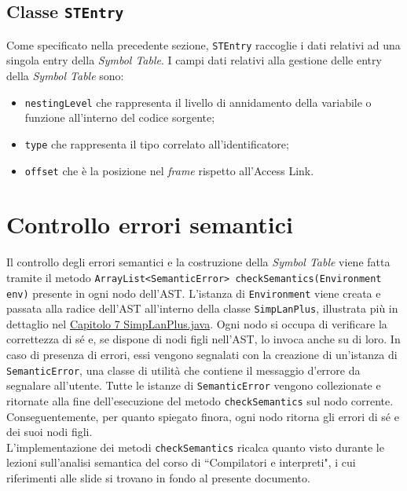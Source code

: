 \documentclass[../report.tex]{subfiles}
\begin{document}
\subsection[Classe STEntry]{Classe \texttt{STEntry}}
Come specificato nella precedente sezione, \verb|STEntry| raccoglie i dati relativi ad una singola entry della \textit{Symbol Table}.
I campi dati relativi alla gestione delle entry della \textit{Symbol Table} sono:
\begin{itemize}
    \item \verb|nestingLevel| che rappresenta il livello di annidamento della variabile o funzione all'interno del codice sorgente;
    \item \verb|type| che rappresenta il tipo correlato all'identificatore;
    \item \verb|offset| che è la posizione nel \textit{frame} rispetto all'Access Link.
\end{itemize}

\section{Controllo errori semantici}
Il controllo degli errori semantici e la costruzione della \textit{Symbol Table} viene fatta tramite il metodo \verb|ArrayList<SemanticError> checkSemantics(Environment env)| presente in ogni nodo dell'AST.
L'istanza di \verb|Environment| viene creata e passata alla radice dell'AST all'interno della classe \verb|SimpLanPlus|, illustrata più in dettaglio nel \hyperref[c:simplanplus-java]{Capitolo 7 SimpLanPlus.java}.
Ogni nodo si occupa di verificare la correttezza di sé e, se dispone di nodi figli nell'AST, lo invoca anche su di loro.
In caso di presenza di errori, essi vengono segnalati con la creazione di un'istanza di \verb|SemanticError|, una classe di utilità che contiene il messaggio d'errore da segnalare all'utente.
Tutte le istanze di \verb|SemanticError| vengono collezionate e ritornate alla fine dell'esecuzione del metodo \verb|checkSemantics| sul nodo corrente.
Conseguentemente, per quanto spiegato finora, ogni nodo ritorna gli errori di sé e dei suoi nodi figli.\\
\noindent
L'implementazione dei metodi \verb|checkSemantics| ricalca quanto visto durante le lezioni sull'analisi semantica del corso di ``Compilatori e interpreti", i cui riferimenti alle slide si trovano in fondo al presente documento.
\end{document}
